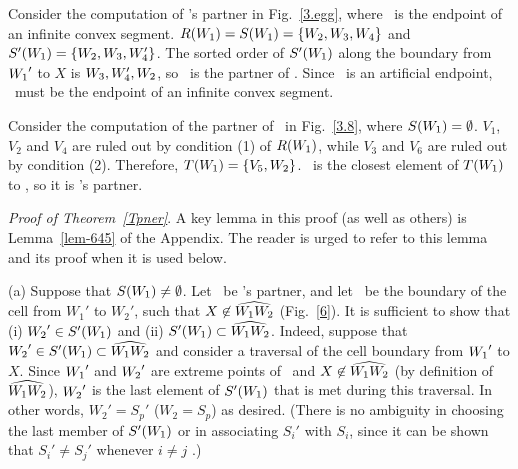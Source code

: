 \begin{example}
{\rm 
Consider the computation of \wo's partner in Fig.~\ref{3.egg}, 
where \wo\ is the endpoint of an infinite convex segment.
\mbox{$R(\mbox{$W_{1}$}) = S(\mbox{$W_{1}$}) = \{\mbox{$W_{2}$},W_{3},W_{4}\}$} and
\mbox{$S'(\mbox{$W_{1}$}) = \{\mbox{$W_{2}$},W_{3},W_{4}'\}$}.
The sorted order of $S'(\mbox{$W_{1}$})$ along the boundary from $\mbox{$W_{1}$} '$ to $X$
is $W_{3},W_{4}',\mbox{$W_{2}$}$, so \wt\ is the partner of \wo.  
Since \wt\ is an artificial endpoint, \wo\ must be the endpoint of an 
infinite convex segment.


Consider the computation of the partner of \wo\ in Fig.~\ref{3.8},
where $S(\mbox{$W_{1}$}) = \emptyset$.
$V_{1}$, $V_{2}$ and $V_{4}$ are ruled out by condition (1) of $R(\mbox{$W_{1}$})$,
while $V_{3}$ and $V_{6}$ are ruled out by condition (2).
Therefore, $T(\mbox{$W_{1}$}) = \{V_{5},W_{2}\}$.
\wt\ is the closest element of $T(\mbox{$W_{1}$})$ to \wo, so it is \wo's partner.
}
\end{example}


\par{\it Proof of Theorem~\ref{Tpner}}. \ignorespaces
A key lemma in this proof (as well as others) is Lemma~\ref{lem-645} of the Appendix.
The reader is urged to refer to this lemma and its proof when it is used below.
%
%

(a) Suppose that $S(\mbox{$W_{1}$}) \neq \emptyset$.
Let \wt\ be \wo's partner, and let \wwh\ be the boundary of the cell 
from $W_{1}'$ to $W_{2}'$, such that $X \not\in \mbox{$\widehat{W_{1}W_{2}}$}$ (Fig.~\ref{6}).
It is sufficient to show that (i) $\mbox{$W_{2}$} ' \in S'(\mbox{$W_{1}$})$ and (ii) $S'(\mbox{$W_{1}$}) \subset \mbox{$\widehat{W_{1}W_{2}}$}$.
Indeed, suppose that $\mbox{$W_{2}$} ' \in S'(\mbox{$W_{1}$}) \subset \mbox{$\widehat{W_{1}W_{2}}$}$
and consider a traversal of the cell boundary from $\mbox{$W_{1}$} '$ to $X$. 
Since $\mbox{$W_{1}$} '$ and $\mbox{$W_{2}$} '$ are extreme points of \wwh\ and
$X \not \in \mbox{$\widehat{W_{1}W_{2}}$}$ (by definition of $\mbox{$\widehat{W_{1}W_{2}}$}$), 
$\mbox{$W_{2}$} '$ is the last element of $S'(\mbox{$W_{1}$})$ that is met during this traversal.
In other words, $W_{2}' = S_{p}'$ ($W_{2} = S_{p}$) as desired.
(There is no ambiguity in choosing the last member of $S'(\mbox{$W_{1}$})$ or in associating
$S_{i}'$ with $S_{i}$, since it can be shown that $S_{i}' \neq S_{j}'$ 
whenever $i \neq j$ \cite[p. 75]{jj}.)  %

